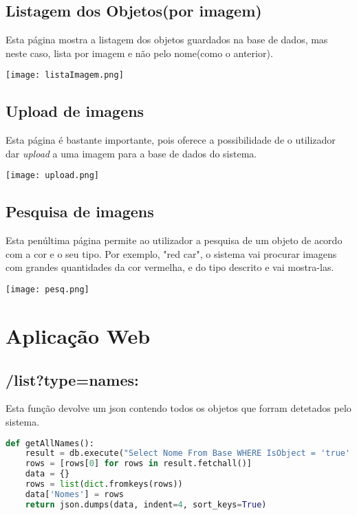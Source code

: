 \documentclass{report}
\begin{document}
\subsection{Listagem dos Objetos(por imagem)}
Esta página mostra a listagem dos objetos guardados na base de dados, mas neste caso, lista por imagem e não pelo nome(como o anterior).
\newline
\begin{center}
   \texttt{[image: listaImagem.png]}
\end{center}

\subsection{Upload de imagens}
Esta página é bastante importante, pois oferece a possibilidade de o utilizador dar \textit{upload} a uma imagem para a base de dados do sistema.

\begin{center}
   \texttt{[image: upload.png]}
\end{center}

\subsection{Pesquisa de imagens}
Esta penúltima página permite ao utilizador a pesquisa de um objeto de acordo com a cor e o seu tipo. Por exemplo, "red car", o sistema vai procurar imagens com grandes quantidades da cor vermelha, e do tipo descrito e vai mostra-las.

\begin{center}
   \texttt{[image: pesq.png]}
\end{center}

\section{Aplicação Web}


\subsection{/list?type=names:}
Esta função devolve um \ac{json} contendo todos os objetos que forram detetados pelo sistema.

\begin{lstlisting}[language=Python, caption={getAllNames}] 
def getAllNames():
    result = db.execute("Select Nome From Base WHERE IsObject = 'true' ")
    rows = [rows[0] for rows in result.fetchall()]
    data = {} 
    rows = list(dict.fromkeys(rows))
    data['Nomes'] = rows
    return json.dumps(data, indent=4, sort_keys=True)
\end{lstlisting}
\end{document}

